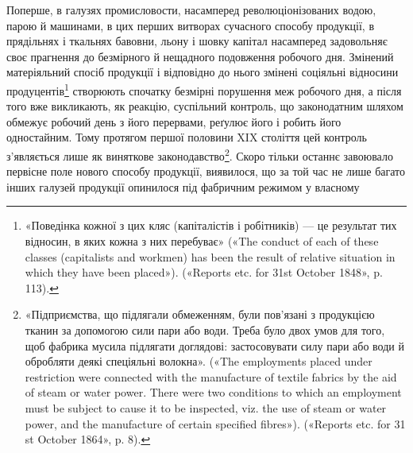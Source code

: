 Поперше, в галузях промисловости, насамперед революціонізованих
водою, парою й машинами, в цих перших витворах сучасного
способу продукції, в прядільнях і ткальнях бавовни,
льону і шовку капітал насамперед задовольняє своє прагнення
до безмірного й нещадного подовження робочого дня. Змінений
матеріяльний спосіб продукції і відповідно до нього змінені
соціяльні відносини продуцентів\footnote{
«Поведінка кожної з цих кляс (капіталістів і робітників) — це
результат тих відносин, в яких кожна з них перебуває» («The conduct
of each of these classes (capitalists and workmen) has been the result of
relative situation in which they have been placed»). («Reports etc. for 31st
October 1848», p. 113).
} створюють спочатку безмірні
порушення меж робочого дня, а після того вже викликають,
як реакцію, суспільний контроль, що законодатним шляхом
обмежує робочий день з його перервами, реґулює його і робить
його одностайним. Тому протягом першої половини XIX століття
цей контроль з’являється лише як виняткове законодавство\footnote{
«Підприємства, що підлягали обмеженням, були пов’язані з
продукцією тканин за допомогою сили пари або води. Треба було двох
умов для того, щоб фабрика мусила підлягати доглядові: застосовувати
силу пари або води й обробляти деякі спеціяльні волокна». («The employments
placed under restriction were connected with the manufacture of
textile fabrics by the aid of steam or water power. There were two conditions
to which an employment must be subject to cause it to be inspected,
viz. the use of steam or water power, and the manufacture of certain specified
fibres»). («Reports etc. for 31 st October 1864», p. 8).
}.
Скоро тільки останнє завоювало первісне поле нового способу
продукції, виявилося, що за той час не лише багато інших галузей
продукції опинилося під фабричним режимом у власному
\parbreak{}  %
